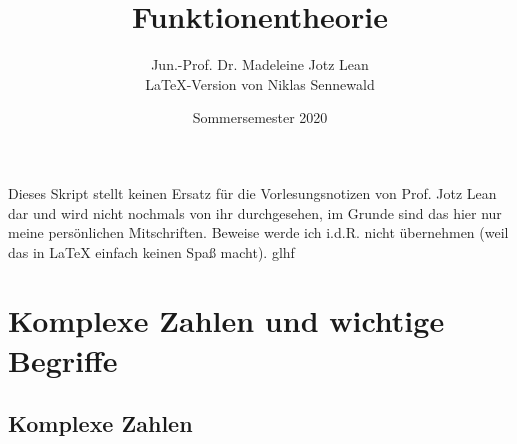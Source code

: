 \documentclass[a4paper,12pt]{book}
\title{\Huge \textbf{Funktionentheorie}}
\author{Jun.-Prof. Dr. Madeleine Jotz Lean\\\LaTeX{}-Version von Niklas Sennewald}
\date{Sommersemester 2020}
\theoremstyle{newthm}
\theoremstyle{newdef}
\theoremstyle{newrem}
\begin{document}
	\frontmatter
	\maketitle

	\setcounter{page}{1}
	\tableofcontents
	\newpage
	\thispagestyle{plain}
	Dieses Skript stellt keinen Ersatz für die Vorlesungsnotizen von Prof. Jotz Lean dar und wird nicht nochmals von ihr durchgesehen, im Grunde sind das hier nur meine persönlichen Mitschriften. Beweise werde ich i.d.R. nicht übernehmen (weil das in \LaTeX{} einfach keinen Spaß macht). \hspace{\fill} glhf
	\mainmatter
	\setcounter{chapter}{-1}	



\chapter[Einführung]{Komplexe Zahlen und wichtige Begriffe}
	
	\section{Komplexe Zahlen}
		
\end{document}
